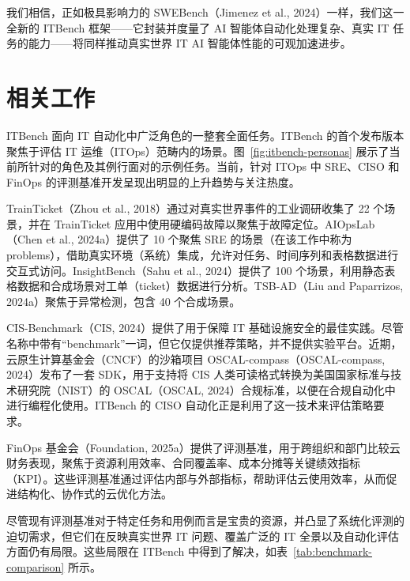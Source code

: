 \documentclass[10pt,UTF8,fontset=fandol]{ctexart}
\begin{document}
我们相信，正如极具影响力的 SWEBench（Jimenez et al., 2024）一样，我们这一全新的 ITBench 框架——它封装并度量了 AI 智能体自动化处理复杂、真实 IT 任务的能力——将同样推动真实世界 IT AI 智能体性能的可观加速进步。

\section{相关工作}
\label{sec:related-work}

ITBench 面向 IT 自动化中广泛角色的一整套全面任务。ITBench 的首个发布版本聚焦于评估 IT 运维（ITOps）范畴内的场景。图~\ref{fig:itbench-personas} 展示了当前所针对的角色及其例行面对的示例任务。当前，针对 ITOps 中 SRE、CISO 和 FinOps 的评测基准开发呈现出明显的上升趋势与关注热度。

TrainTicket（Zhou et al., 2018）通过对真实世界事件的工业调研收集了 22 个场景，并在 TrainTicket 应用中使用硬编码故障以聚焦于故障定位。AIOpsLab（Chen et al., 2024a）提供了 10 个聚焦 SRE 的场景（在该工作中称为 problems），借助真实环境（系统）集成，允许对任务、时间序列和表格数据进行交互式访问。InsightBench（Sahu et al., 2024）提供了 100 个场景，利用静态表格数据和合成场景对工单（ticket）数据进行分析。TSB-AD（Liu and Paparrizos, 2024a）聚焦于异常检测，包含 40 个合成场景。

CIS-Benchmark（CIS, 2024）提供了用于保障 IT 基础设施安全的最佳实践。尽管名称中带有“benchmark”一词，但它仅提供推荐策略，并不提供实验平台。近期，云原生计算基金会（CNCF）的沙箱项目 OSCAL-compass（OSCAL-compass, 2024）发布了一套 SDK，用于支持将 CIS 人类可读格式转换为美国国家标准与技术研究院（NIST）的 OSCAL（OSCAL, 2024）合规标准，以便在合规自动化中进行编程化使用。ITBench 的 CISO 自动化正是利用了这一技术来评估策略要求。

FinOps 基金会（Foundation, 2025a）提供了评测基准，用于跨组织和部门比较云财务表现，聚焦于资源利用效率、合同覆盖率、成本分摊等关键绩效指标（KPI）。这些评测基准通过评估内部与外部指标，帮助评估云使用效率，从而促进结构化、协作式的云优化方法。

尽管现有评测基准对于特定任务和用例而言是宝贵的资源，并凸显了系统化评测的迫切需求，但它们在反映真实世界 IT 问题、覆盖广泛的 IT 全景以及自动化评估方面仍有局限。这些局限在 ITBench 中得到了解决，如表~\ref{tab:benchmark-comparison} 所示。
\end{document}
